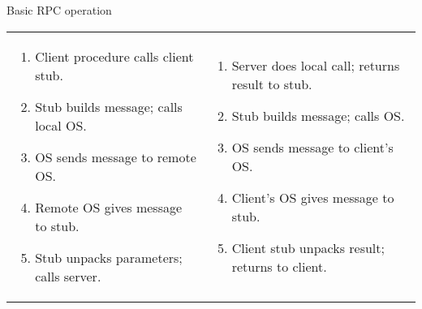 \begin{slide}{Basic RPC operation}
  \begin{block}{}
    \begin{center}
    \end{center}
  \end{block}
    {\scriptsize
      \begin{tabular}{@{}ll}
        \begin{minipage}{0.45\textwidth}
          \begin{enumerate}\tightlist
          \item Client procedure calls client stub.
          \item Stub builds message; calls local OS.
          \item OS sends message to remote OS.
          \item Remote OS gives message to stub.
          \item Stub unpacks parameters; calls server.
          \end{enumerate}
        \end{minipage} &
        \begin{minipage}{0.55\textwidth}
          \begin{enumerate}\tightlist\setcounter{enumi}{5}
          \item Server does local call; returns result to stub.
          \item Stub builds message; calls  OS.
          \item OS sends message to client's OS.
          \item Client's OS gives message to stub.
          \item Client stub unpacks result; returns to client.
          \end{enumerate}
        \end{minipage}
      \end{tabular}
    }
\end{slide}
